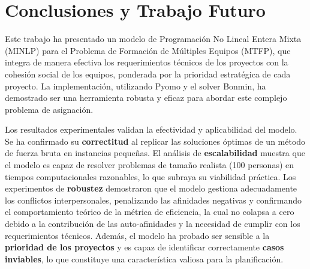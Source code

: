 \documentclass[conference]{IEEEtran}
\begin{document}

\section{Conclusiones y Trabajo Futuro}
Este trabajo ha presentado un modelo de Programación No Lineal Entera Mixta (MINLP) para el Problema de Formación de Múltiples Equipos (MTFP), que integra de manera efectiva los requerimientos técnicos de los proyectos con la cohesión social de los equipos, ponderada por la prioridad estratégica de cada proyecto. La implementación, utilizando Pyomo y el solver Bonmin, ha demostrado ser una herramienta robusta y eficaz para abordar este complejo problema de asignación.

Los resultados experimentales validan la efectividad y aplicabilidad del modelo. Se ha confirmado su \textbf{correctitud} al replicar las soluciones óptimas de un método de fuerza bruta en instancias pequeñas. El análisis de \textbf{escalabilidad} muestra que el modelo es capaz de resolver problemas de tamaño realista (100 personas) en tiempos computacionales razonables, lo que subraya su viabilidad práctica. Los experimentos de \textbf{robustez} demostraron que el modelo gestiona adecuadamente los conflictos interpersonales, penalizando las afinidades negativas y confirmando el comportamiento teórico de la métrica de eficiencia, la cual no colapsa a cero debido a la contribución de las auto-afinidades y la necesidad de cumplir con los requerimientos técnicos. Además, el modelo ha probado ser sensible a la \textbf{prioridad de los proyectos} y es capaz de identificar correctamente \textbf{casos inviables}, lo que constituye una característica valiosa para la planificación.
\end{document}
